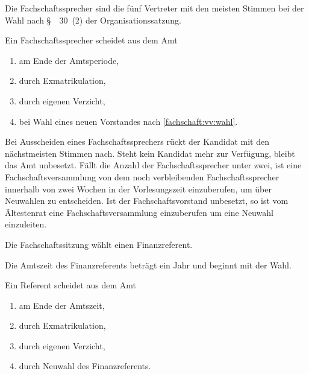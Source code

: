 \documentclass[a4paper,parskip=half,numbers=noenddot]{scrartcl}
\begin{document}
\begin{contract}
%
%

\label{fs:sprecher}

Die Fachschaftssprecher sind die fünf Vertreter mit den meisten Stimmen bei der Wahl nach §~~30~(2) der Organisationssatzung.

Ein Fachschaftssprecher scheidet aus dem Amt
  \begin{enumerate}
  \item am Ende der Amtsperiode,
  \item durch Exmatrikulation,
  \item durch eigenen Verzicht,
  \item bei Wahl eines neuen Vorstandes nach \ref{fachschaft:vv:wahl}.
\end{enumerate}

Bei Ausscheiden eines Fach\-schaftssprechers rückt der Kandidat mit den nächstmeisten Stimmen nach. Steht kein Kandidat mehr zur Verfügung, bleibt das Amt unbesetzt. Fällt die Anzahl der Fachschaftssprecher unter zwei, ist eine Fachschaftsversammlung von dem noch verbleibenden Fachschaftssprecher innerhalb von zwei Wochen in der Vorlesungszeit einzuberufen, um über Neuwahlen zu entscheiden. Ist der Fachschaftsvorstand unbesetzt, so ist vom Ältestenrat eine Fachschaftsversammlung einzuberufen um eine Neuwahl einzuleiten.





%
%



Die Fachschaftssitzung wählt einen Finanzreferent.

Die Amtszeit des Finanzreferents beträgt ein Jahr und beginnt mit der Wahl.

Ein Referent scheidet aus dem Amt
\begin{enumerate}
\item am Ende der Amtszeit,
\item durch Exmatrikulation,
\item durch eigenen Verzicht,
\item durch Neuwahl des Finanzreferents.
\end{enumerate}


\end{contract}
\end{document}
